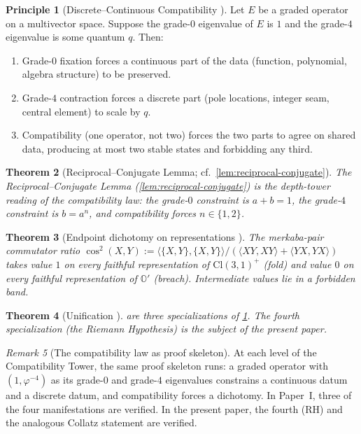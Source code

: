 \documentclass[11pt,a4paper]{article}
\theoremstyle{plain}
\newtheorem{theorem}{Theorem}[section]
\theoremstyle{definition}
\newtheorem{principle}[theorem]{Principle}
\theoremstyle{remark}
\newtheorem{remark}[theorem]{Remark}
\numberwithin{equation}{section}
\providecommand{\Cl}{\mathrm{Cl}}
\providecommand{\Os}{\mathbb{O}'}
\providecommand{\vp}{\varphi}
\begin{document}
\begin{principle}[Discrete--Continuous Compatibility {\cite[Princ.~6.1]{paper-I-substrate}}]
\label{principle:law}
Let $E$ be a graded operator on a multivector space.  Suppose the
grade-$0$ eigenvalue of $E$ is $1$ and the grade-$4$ eigenvalue is
some quantum $q$.  Then:
\begin{enumerate}[label=\textnormal{(\arabic*)}]
  \item Grade-$0$ fixation forces a continuous part of the data
    (function, polynomial, algebra structure) to be preserved.
  \item Grade-$4$ contraction forces a discrete part (pole
    locations, integer seam, central element) to scale by $q$.
  \item Compatibility (one operator, not two) forces the two
    parts to agree on shared data, producing at most two stable
    states and forbidding any third.
\end{enumerate}
\end{principle}

\begin{theorem}[Reciprocal--Conjugate Lemma; cf.\ \cref{lem:reciprocal-conjugate}]
\label{thm:rcl}
The Reciprocal--Conjugate Lemma (\cref{lem:reciprocal-conjugate})
is the depth-tower reading of the compatibility law: the grade-$0$
constraint is $a + b = 1$, the grade-$4$ constraint is $b = a^n$,
and compatibility forces $n \in \{1, 2\}$.
\end{theorem}

\begin{theorem}[Endpoint dichotomy on representations {\cite[Thm.~7.5]{paper-I-substrate}}]
\label{thm:rep-dichotomy}
The merkaba-pair commutator ratio $\cos^2(X, Y) :=
\langle\{X,Y\}, \{X,Y\}\rangle/(\langle XY, XY\rangle + \langle
YX, YX\rangle)$ takes value $1$ on every faithful representation
of $\Cl(3,1)^+$ (\emph{fold}) and value $0$ on every faithful
representation of $\Os$ (\emph{breach}).  Intermediate values lie
in a forbidden band.
\end{theorem}

\begin{theorem}[Unification {\cite[Thm.~7.6]{paper-I-substrate}}]
\label{thm:unification}
 are three
specializations of \cref{principle:law}.  The fourth specialization
(the Riemann Hypothesis) is the subject of the present paper.
\end{theorem}

\begin{remark}[The compatibility law as proof skeleton]
\label{rmk:proof-skeleton}
At each level of the Compatibility Tower, the same proof skeleton
runs: a graded operator with $(1, \vp^{-4})$ as its grade-$0$ and
grade-$4$ eigenvalues constrains a continuous datum and a discrete
datum, and compatibility forces a dichotomy.  In Paper~I, three of
the four manifestations are verified.  In the present paper, the
fourth (RH) and the analogous Collatz statement are verified.
\end{remark}
\end{document}
